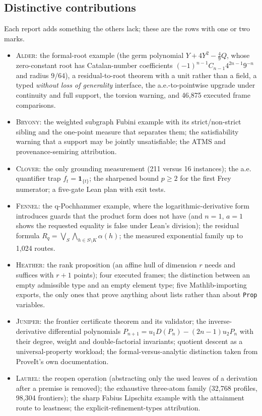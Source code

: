 \documentclass[11pt,a4paper]{article}
\newcommand{\code}[1]{\nolinkurl{#1}}
\newcommand{\Al}{\textsc{Alder}}
\newcommand{\Br}{\textsc{Bryony}}
\newcommand{\Cl}{\textsc{Clover}}
\newcommand{\Fe}{\textsc{Fennel}}
\newcommand{\He}{\textsc{Heather}}
\newcommand{\Ju}{\textsc{Juniper}}
\newcommand{\La}{\textsc{Laurel}}
\theoremstyle{definition}
\theoremstyle{plain}
\begin{document}
\subsection{Distinctive contributions}
Each report adds something the others lack; these are the rows with one or two marks.
\begin{itemize}
\item \Al: the formal-root example (the germ polynomial $Y+4Y^2-\tfrac49Q$, whose zero-constant root has Catalan-number coefficients $(-1)^{n-1}C_{n-1}4^{2n-1}9^{-n}$ and radius $9/64$), a residual-to-root theorem with a unit rather than a field, a typed \emph{without loss of generality} interface, the a.e.-to-pointwise upgrade under continuity and full support, the torsion warning, and 46,875 executed frame comparisons.
\item \Br: the weighted subgraph Fubini example with its strict/non-strict sibling and the one-point measure that separates them; the satisfiability warning that a support may be jointly unsatisfiable; the ATMS and provenance-semiring attribution.
\item \Cl: the only grounding measurement (211 versus 16 instances); the a.e. quantifier trap $f_t=\mathbf 1_{\{t\}}$; the sharpened bound $p\ge2$ for the first Frey numerator; a five-gate Lean plan with exit tests.
\item \Fe: the q-Pochhammer example, where the logarithmic-derivative form introduces guards that the product form does not have (and $n=1$, $a=1$ shows the requested equality is false under Lean's division); the residual formula $R_q=\bigvee_S\bigwedge_{h\in S\setminus K}\alpha(h)$; the measured exponential family up to 1,024 routes.
\item \He: the rank proposition (an affine hull of dimension $r$ needs and suffices with $r+1$ points); four executed frames; the distinction between an empty admissible type and an empty element type; five Mathlib-importing exports, the only ones that prove anything about lists rather than about \code{Prop} variables.
\item \Ju: the frontier certificate theorem and its validator; the inverse-derivative differential polynomials $P_{n+1}=u_1D(P_n)-(2n-1)u_2P_n$ with their degree, weight and double-factorial invariants; quotient descent as a universal-property workload; the formal-versus-analytic distinction taken from ProveIt's own documentation.
\item \La: the reopen operation (abstracting only the used leaves of a derivation after a premise is removed); the exhaustive three-atom family (32,768 profiles, 98,304 frontiers); the sharp Fabius Lipschitz example with the attainment route to leastness; the explicit-refinement-types attribution.

\end{itemize}
\end{document}
